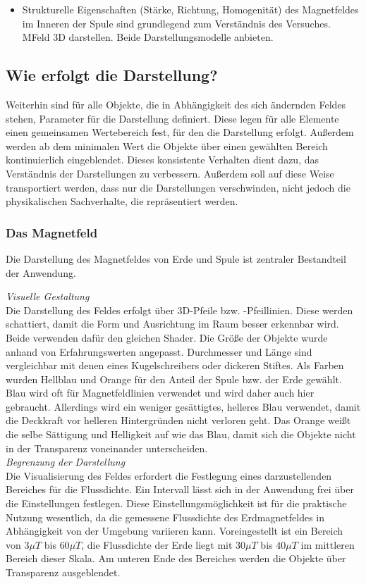 \begin{itemize}
	\item Strukturelle Eigenschaften (Stärke, Richtung, Homogenität) des Magnetfeldes im Inneren der Spule sind grundlegend zum Verständnis des Versuches. MFeld 3D darstellen. Beide Darstellungsmodelle anbieten. 
\end{itemize}


\subsection{Wie erfolgt die Darstellung?}
Weiterhin sind für alle Objekte, die in Abhängigkeit des sich ändernden Feldes stehen, Parameter für die Darstellung definiert. Diese legen für alle Elemente einen gemeinsamen Wertebereich fest, für den die Darstellung erfolgt. Außerdem werden ab dem minimalen Wert die Objekte über einen gewählten Bereich kontinuierlich eingeblendet. Dieses konsistente Verhalten dient dazu, das Verständnis der Darstellungen zu verbessern. Außerdem soll auf diese Weise transportiert werden, dass nur die Darstellungen verschwinden, nicht jedoch die physikalischen Sachverhalte, die repräsentiert werden.\\
\subsubsection{Das Magnetfeld}
\label{sec-4-2-2}
Die Darstellung des Magnetfeldes von Erde und Spule ist zentraler Bestandteil der Anwendung.

\textit{Visuelle Gestaltung}\\
Die Darstellung des Feldes erfolgt über 3D-Pfeile bzw. -Pfeillinien. Diese werden schattiert, damit die Form und Ausrichtung im Raum besser erkennbar wird. Beide verwenden dafür den gleichen Shader. Die Größe der Objekte wurde anhand von Erfahrungswerten angepasst. Durchmesser und Länge sind vergleichbar mit denen eines Kugelschreibers oder dickeren Stiftes. Als Farben wurden Hellblau und Orange für den Anteil der Spule bzw. der Erde gewählt. Blau wird oft für Magnetfeldlinien verwendet und wird daher auch hier gebraucht. Allerdings wird ein weniger gesättigtes, helleres Blau verwendet, damit die Deckkraft vor helleren Hintergründen nicht verloren geht. Das Orange weißt die selbe Sättigung und Helligkeit auf wie das Blau, damit sich die Objekte nicht in der Transparenz voneinander unterscheiden.\\

\textit{Begrenzung der Darstellung}\\
Die Visualisierung des Feldes erfordert die Festlegung eines darzustellenden Bereiches für die Flussdichte. Ein Intervall lässt sich in der Anwendung frei über die Einstellungen festlegen. Diese Einstellungsmöglichkeit ist für die praktische Nutzung wesentlich, da die gemessene Flussdichte des Erdmagnetfeldes in Abhängigkeit von der Umgebung variieren kann. Voreingestellt ist ein Bereich von $3\mu T$ bis $60\mu T$, die Flussdichte der Erde liegt mit $30 \mu T$ bis $40 \mu T$ im mittleren Bereich dieser Skala. Am unteren Ende des Bereiches werden die Objekte über Transparenz ausgeblendet.\\

